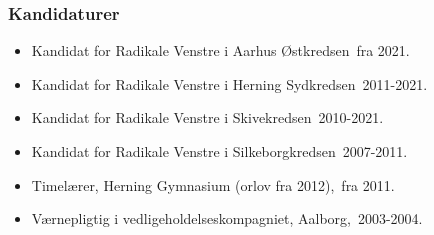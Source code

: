 \documentclass[11pt, a4paper]{awesome-cv}
\begin{document}
\begin{cvletter}
\subsubsection*{Kandidaturer}
\begin{itemize}
\item Kandidat for Radikale Venstre i Aarhus Østkredsen fra 2021.
\item Kandidat for Radikale Venstre i Herning Sydkredsen 2011-2021.
\item Kandidat for Radikale Venstre i Skivekredsen 2010-2021.
\item Kandidat for Radikale Venstre i Silkeborgkredsen 2007-2011.
\end{itemize}
\begin{itemize}
\item Timelærer, Herning Gymnasium (orlov fra 2012), fra 2011.
\item Værnepligtig i vedligeholdelseskompagniet, Aalborg, 2003-2004.
\end{itemize}
\end{cvletter}
\end{document}
